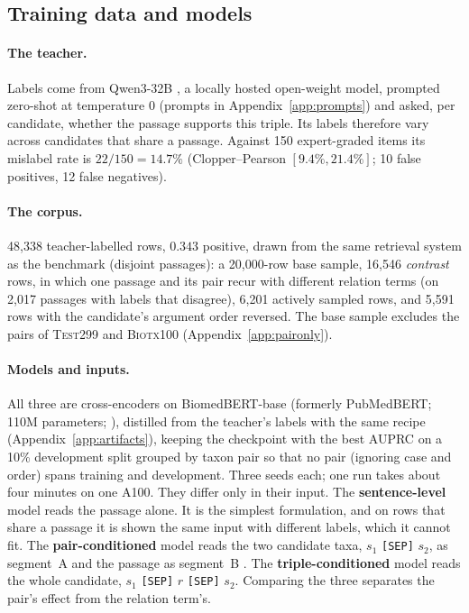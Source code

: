 \documentclass[11pt]{article}
\begin{document}
\subsection{Training data and models}
\label{sec:verifier}

\paragraph{The teacher.}
Labels come from Qwen3-32B \citep{qwen2025technical}, a locally hosted open-weight model,
prompted zero-shot at temperature 0 (prompts in Appendix~\ref{app:prompts}) and asked, per
candidate, whether the passage supports this triple. Its labels therefore vary across
candidates that share a passage. Against 150 expert-graded items its mislabel rate is
$22/150 = 14.7\%$ (Clopper--Pearson $[9.4\%, 21.4\%]$; 10 false positives, 12 false negatives).

\paragraph{The corpus.}
48{,}338 teacher-labelled rows, $0.343$ positive, drawn from the same retrieval system as the benchmark
(disjoint passages): a 20{,}000-row base sample, 16{,}546 \emph{contrast} rows, in which one passage
and its pair recur with different relation terms (on 2{,}017 passages with labels that disagree),
6{,}201 actively sampled rows, and 5{,}591 rows with the candidate's argument order reversed. The base
sample excludes the pairs of \textsc{Test299} and \textsc{Biotx100} (Appendix~\ref{app:paironly}).

\paragraph{Models and inputs.}
All three are cross-encoders on BiomedBERT-base (formerly PubMedBERT; 110M parameters; \citealp{gu2021domain}), distilled
from the teacher's labels \citep{bucilua2006model,hinton2015distilling} with the same recipe
(Appendix~\ref{app:artifacts}), keeping the checkpoint with the best AUPRC on a 10\%
development split grouped by taxon pair so that no pair (ignoring case and order) spans training and development. Three seeds
each; one run takes about four minutes on one A100. They differ only in their input.
The \textbf{sentence-level} model reads the passage alone. It is the simplest formulation, and on rows that share a passage it is shown the same input with different
labels, which it cannot fit. The \textbf{pair-conditioned} model reads the two candidate taxa,
$s_1$ \texttt{[SEP]} $s_2$, as segment~A and the passage as segment~B
\citep{nogueira2019passage}. The \textbf{triple-conditioned} model reads the whole candidate,
$s_1$ \texttt{[SEP]} $r$ \texttt{[SEP]} $s_2$. Comparing the three separates the pair's effect from the relation term's.
\end{document}

